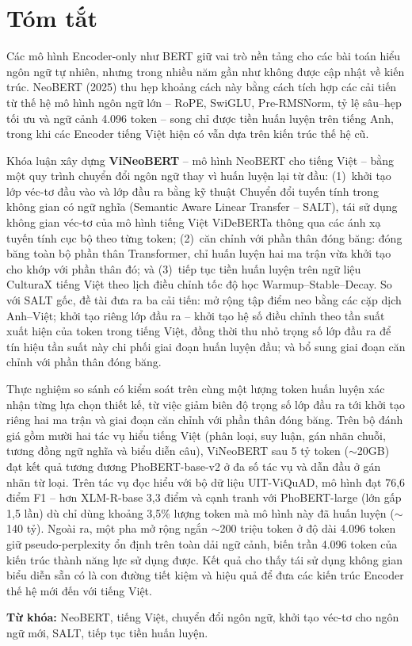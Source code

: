 \chapter*{Tóm tắt}
\label{summary}

Các mô hình Encoder-only như BERT giữ vai trò nền tảng cho các bài toán hiểu ngôn ngữ
tự nhiên, nhưng trong nhiều năm gần như không được cập nhật về kiến trúc. NeoBERT
(2025) thu hẹp khoảng cách này bằng cách tích hợp các cải tiến từ thế hệ mô hình ngôn
ngữ lớn -- RoPE, SwiGLU, Pre-RMSNorm, tỷ lệ sâu--hẹp tối ưu và ngữ cảnh 4.096 token --
song chỉ được tiền huấn luyện trên tiếng Anh, trong khi các Encoder tiếng Việt hiện có
vẫn dựa trên kiến trúc thế hệ cũ.

Khóa luận xây dựng \textbf{ViNeoBERT} -- mô hình NeoBERT cho tiếng Việt -- bằng
một quy trình chuyển đổi ngôn ngữ thay vì huấn luyện lại từ đầu: (1)~khởi tạo lớp véc-tơ đầu vào và lớp đầu ra bằng kỹ thuật Chuyển đổi tuyến tính trong không gian có ngữ nghĩa (Semantic Aware Linear Transfer -- SALT), tái sử dụng
không gian véc-tơ của mô hình tiếng Việt ViDeBERTa thông qua các ánh xạ tuyến tính cục
bộ theo từng token; (2)~căn chỉnh với phần thân đóng băng: đóng băng toàn bộ phần thân Transformer,
chỉ huấn luyện hai ma trận vừa khởi tạo cho khớp với phần thân đó; và (3)~tiếp tục tiền huấn luyện trên ngữ liệu CulturaX tiếng
Việt theo lịch điều chỉnh tốc độ học Warmup--Stable--Decay. So với SALT gốc, đề tài đưa ra ba cải
tiến: mở rộng tập điểm neo bằng các cặp dịch Anh--Việt; khởi tạo riêng lớp đầu ra --
khởi tạo hệ số điều chỉnh theo tần suất xuất hiện của token trong tiếng Việt, đồng thời thu nhỏ
trọng số lớp đầu ra để tín hiệu tần suất này chi phối giai đoạn huấn luyện đầu; và bổ sung
giai đoạn căn chỉnh với phần thân đóng băng.

Thực nghiệm so sánh có kiểm soát trên cùng một lượng token huấn luyện xác nhận từng lựa chọn
thiết kế, từ việc giảm biên độ trọng số lớp đầu ra tới khởi tạo riêng hai ma trận và giai đoạn căn chỉnh với phần thân đóng băng. Trên bộ đánh giá gồm mười hai tác vụ hiểu tiếng Việt (phân loại, suy
luận, gán nhãn chuỗi, tương đồng ngữ nghĩa và biểu diễn câu), ViNeoBERT sau 5 tỷ token
($\sim$20GB) đạt kết quả tương đương PhoBERT-base-v2 ở đa số tác vụ và dẫn đầu ở gán nhãn
từ loại. Trên tác vụ đọc hiểu với bộ dữ liệu UIT-ViQuAD, mô hình đạt
76,6 điểm F1 -- hơn XLM-R-base 3,3 điểm và cạnh tranh với PhoBERT-large (lớn gấp 1,5 lần)
dù chỉ dùng khoảng 3,5\% lượng token mà mô hình này đã huấn luyện ($\sim$140 tỷ).
Ngoài ra, một pha mở rộng ngắn $\sim$200 triệu token ở độ dài 4.096 token giữ
pseudo-perplexity ổn định trên toàn dải ngữ cảnh, biến trần 4.096 token của kiến trúc
thành năng lực sử dụng được. Kết quả cho thấy tái sử dụng không gian biểu diễn sẵn có
là con đường tiết kiệm và hiệu quả để đưa các kiến trúc Encoder thế hệ mới đến với
tiếng Việt.

\vspace{4mm}
\noindent\textbf{Từ khóa:} NeoBERT, tiếng Việt, chuyển đổi ngôn ngữ, khởi tạo véc-tơ
cho ngôn ngữ mới, SALT, tiếp tục tiền huấn luyện.
